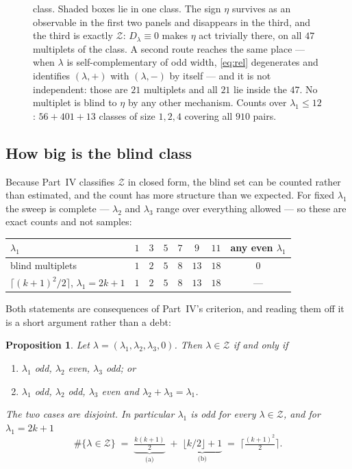 \documentclass[11pt,a4paper]{article}
\newtheorem{proposition}{Proposition}
\begin{document}
\begin{figure}[t]
{class. Shaded boxes lie in one class. The sign $\eta$ survives as an observable in the first two
panels and disappears in the third, and the third is exactly $\mathcal Z$: $D_\lambda\equiv0$ makes
$\eta$ act trivially there, on all $47$ multiplets of the class. A second route reaches the same
place --- when $\lambda$ is self-complementary of odd width, \eqref{eq:rel} degenerates and
identifies $(\lambda,+)$ with $(\lambda,-)$ by itself --- and it is not independent: those are
$21$ multiplets and all $21$ lie inside the $47$. No multiplet is blind to $\eta$ by any other
mechanism. Counts over $\lambda_1\le12$: $56+401+13$ classes of size $1,2,4$ covering all $910$
pairs.}
\label{fig:fibre}
\end{figure}

\subsection*{How big is the blind class}\label{sec:count}

Because Part~IV classifies $\mathcal Z$ in closed form, the blind set can be counted rather than
estimated, and the count has more structure than we expected. For fixed $\lambda_1$ the sweep is
complete --- $\lambda_2$ and $\lambda_3$ range over everything allowed --- so these are exact counts
and not samples:

\begin{center}\small
{}
\begin{tabular}{lccccccc}
\toprule
\rowcolor{hdrblue!12}
$\lambda_1$ & $1$ & $3$ & $5$ & $7$ & $9$ & $11$ & any even $\lambda_1$\\
\midrule
blind multiplets & $1$ & $2$ & $5$ & $8$ & $13$ & $18$ & \textcolor{warmred}{$0$}\\
$\lceil (k+1)^2/2\rceil$, $\lambda_1=2k{+}1$ & $1$ & $2$ & $5$ & $8$ & $13$ & $18$ & ---\\
\bottomrule
\end{tabular}
\end{center}

\noindent Both statements are consequences of Part~IV's criterion, and reading them off it is a
short argument rather than a debt:

\begin{proposition}\label{prop:count}
Let $\lambda=(\lambda_1,\lambda_2,\lambda_3,0)$. Then $\lambda\in\mathcal Z$ if and only if
\begin{enumerate}\itemsep1pt
\item[(a)] $\lambda_1$ odd, $\lambda_2$ even, $\lambda_3$ odd; \quad or
\item[(b)] $\lambda_1$ odd, $\lambda_2$ odd, $\lambda_3$ even and $\lambda_2+\lambda_3=\lambda_1$.
\end{enumerate}
The two cases are disjoint. In particular $\lambda_1$ is \emph{odd} for every $\lambda\in\mathcal Z$,
and for $\lambda_1=2k+1$
\[
\#\{\lambda\in\mathcal Z\}\;=\;\underbrace{\tfrac{k(k+1)}{2}}_{\text{(a)}}
\;+\;\underbrace{\lfloor k/2\rfloor+1}_{\text{(b)}}\;=\;\Big\lceil \tfrac{(k+1)^2}{2}\Big\rceil .
\]
\end{proposition}
\end{document}
